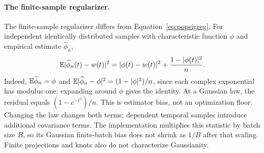 \paragraph{The finite-sample regularizer.}
The finite-sample regularizer differs from Equation~\ref{eq:popsigreg}.
For independent identically distributed samples with characteristic function $\phi$ and empirical estimate $\widehat\phi_n$,
\begin{equation}
\mathbb{E}|\widehat\phi_n(t)-w(t)|^2
=|\phi(t)-w(t)|^2+\frac{1-|\phi(t)|^2}{n}.
\end{equation}
Indeed, $\mathbb{E}\widehat\phi_n=\phi$ and $\mathbb{E}|\widehat\phi_n-\phi|^2=(1-|\phi|^2)/n$, since each complex exponential has modulus one; expanding around $\phi$ gives the identity.
At a Gaussian law, the residual equals $(1-e^{-t^2})/n$.
This is estimator bias, not an optimization floor.
Changing the law changes both terms; dependent temporal samples introduce additional covariance terms. The implementation multiplies this statistic by batch size $B$, so its Gaussian finite-batch bias does not shrink as $1/B$ after that scaling.
Finite projections and knots also do not characterize Gaussianity.


